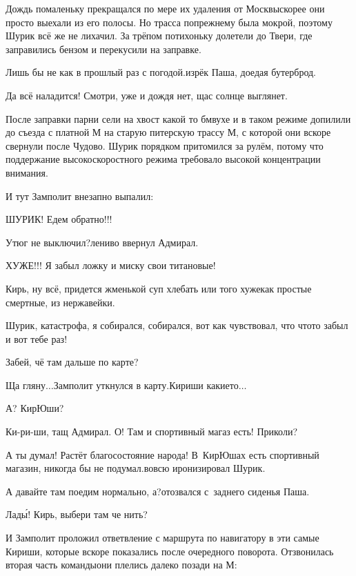 Дождь помаленьку прекращался по мере их удаления от Москвы\mdash скорее они просто выехали из его полосы. Но трасса по\sdash прежнему была мокрой, поэтому Шурик всё же не лихачил. За трёпом потихоньку долетели до Твери, где заправились бензом и перекусили на заправке.

\diagdash Лишь бы не как в прошлый раз с погодой.\mdash изрёк Паша, доедая бутерброд.

\diagdash Да всё наладится! Смотри, уже и дождя нет, щас солнце выглянет.

После заправки парни сели на хвост какой то бмв\sdash ухе и в таком режиме допилили до съезда с платной М на старую питерскую трассу М, с которой они вскоре свернули после Чудово. Шурик порядком притомился за рулём, потому что поддержание высокоскоростного режима требовало высокой концентрации внимания. 

И тут Замполит внезапно выпалил:

\diagdash ШУРИК! Едем обратно!!!

\diagdash Утюг не выключил?\mdash лениво ввернул Адмирал.

\diagdash ХУЖЕ!!! Я забыл ложку и миску свои титановые!

\diagdash Кирь, ну всё, придется жменькой суп хлебать или того хуже\mdash как простые смертные, из нержавейки.

\diagdash Шурик, катастрофа, я собирался, собирался, вот как чувствовал, что что\sdash то забыл и вот тебе раз!

\diagdash Забей, чё там дальше по карте?

\diagdash Ща гляну$\ldots$\mdash Замполит уткнулся в карту.\mdash Кириши какие\sdash то$\ldots$

\diagdash А? КирЮши?

\diagdash Ки-ри-ши, тащ Адмирал. О! Там и спортивный магаз есть! Приколи?

\diagdash А ты думал! Растёт благосостояние народа! В~КирЮшах есть спортивный магазин, никогда бы не подумал.\mdash вовсю иронизировал Шурик.

\diagdash А давайте там поедим нормально, а?\mdash отозвался с~заднего сиденья Паша.

\diagdash Лад\'{ы}! Кирь, выбери там че нить?

И Замполит проложил ответвление с маршрута по навигатору в эти самые Кириши, которые вскоре показались после очередного поворота. Отзвонилась вторая часть команды\mdash они плелись далеко позади на М:

